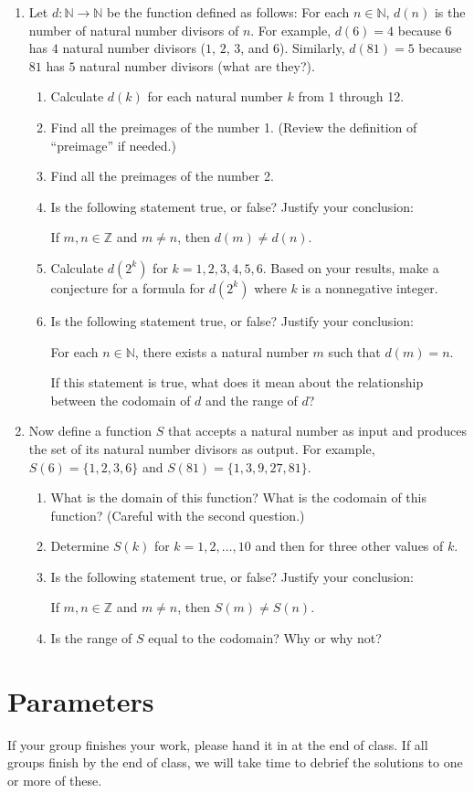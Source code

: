 \documentclass[11pt]{article}
\begin{document}
\begin{enumerate}
	\item Let $d: \mathbb{N} \rightarrow \mathbb{N}$ be the function defined as follows: For each $n \in \mathbb{N}$, $d(n)$ is the number of natural number divisors of $n$. For example, $d(6) = 4$ because $6$ has $4$ natural number divisors ($1$, $2$, $3$, and $6$). Similarly, $d(81) = 5$ because $81$ has $5$ natural number divisors (what are they?). 
	\begin{enumerate}
		\item Calculate $d(k)$ for each natural number $k$ from 1 through 12.
		\item Find all the preimages of the number 1. (Review the definition of ``preimage'' if needed.) 
		\item Find all the preimages of the number 2. 
		\item Is the following statement true, or false? Justify your conclusion: 
		\begin{center}
			If $m,n \in \mathbb{Z}$ and $m \neq n$, then $d(m) \neq d(n)$. 
		\end{center}
		
		\item Calculate $d(2^k)$ for $k=1, 2, 3, 4, 5, 6$. Based on your results, make a conjecture for a formula for $d(2^k)$ where $k$ is a nonnegative integer. 
		
		\item Is the following statement true, or false? Justify your conclusion: 
		\begin{center}
			For each $n \in \mathbb{N}$, there exists a natural number $m$ such that $d(m) = n$. 
		\end{center}
		If this statement is true, what does it mean about the relationship between the codomain of $d$ and the range of $d$? 
		
	\end{enumerate}
	
	\item Now define a function $S$ that accepts a natural number as input and produces the set of its natural number divisors as output. For example, $S(6) = \{ 1, 2, 3, 6\}$ and $S(81) = \{ 1, 3, 9, 27, 81 \}$. 
	\begin{enumerate}
		\item What is the domain of this function? What is the codomain of this function? (Careful with the second question.) 
		\item Determine $S(k)$ for $k = 1, 2, \dots, 10$ and then for three other values of $k$. 
		\item Is the following statement true, or false? Justify your conclusion: 
		\begin{center}
			If $m,n \in \mathbb{Z}$ and $m \neq n$, then $S(m) \neq S(n)$. 
		\end{center}
		
		\item Is the range of $S$ equal to the codomain? Why or why not? 
	\end{enumerate}
	
	
\end{enumerate}

\section*{Parameters}

If your group finishes your work, please hand it in at the end of class. If all groups finish by the end of class, we will take time to debrief the solutions to one or more of these. 
\end{document}
